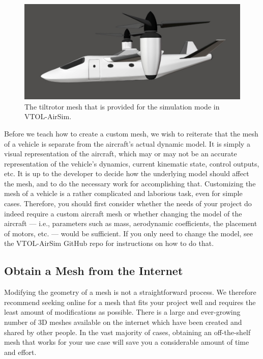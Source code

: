 \begin{figure}[t]
    \centering
    \includegraphics[width=\textwidth]{figures/tiltrotor_mesh}
    \caption[Default tiltrotor mesh]{
        The tiltrotor mesh that is provided for the  simulation mode in VTOL-AirSim.}%
    \label{fig:tiltrotor_mesh}
\end{figure}

Before we teach how to create a custom mesh, we wish to reiterate that the mesh of a vehicle is separate from the aircraft's actual dynamic model. It is simply a visual representation of the aircraft, which may or may not be an accurate representation of the vehicle's dynamics, current kinematic state, control outputs, etc. It is up to the developer to decide how the underlying model should affect the mesh, and to do the necessary work for accomplishing that. Customizing the mesh of a vehicle is a rather complicated and laborious task, even for simple cases. Therefore, you should first consider whether the needs of your project do indeed require a custom aircraft mesh or whether changing the model of the aircraft --- i.e., parameters such as mass, aerodynamic coefficients, the placement of motors, etc. --- would be sufficient. If you only need to change the model, see the VTOL-AirSim GitHub repo for instructions on how to do that.

\subsection{Obtain a Mesh from the Internet}
Modifying the geometry of a mesh is not a straightforward process. We therefore recommend seeking online for a mesh that fits your project well and requires the least amount of modifications as possible. There is a large and ever-growing number of 3D meshes available on the internet which have been created and shared by other people. In the vast majority of cases, obtaining an off-the-shelf mesh that works for your use case will save you a considerable amount of time and effort.

